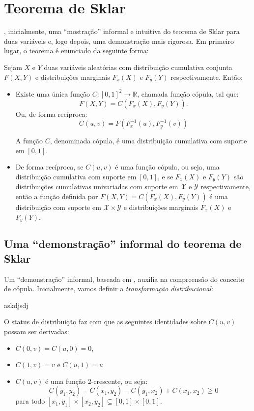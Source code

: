 \chapter{Teorema de Sklar}

, inicialmente, uma ``mostração'' informal e intuitiva do teorema de Sklar para duas variáveis e, logo depois, uma demonstração mais rigorosa. Em primeiro lugar, o teorema é enunciado da seguinte forma:

\begin{Teorema}
Sejam $X$ e $Y$ duas variáveis aleatórias com distribuição cumulativa conjunta $F(X,Y)$ e distribuições marginais $F_x(X)$ e $F_y(Y)$ respectivamente. Então:
\begin{itemize}
 \item Existe uma única função $C : [0,1]^2 \to \mathbb{R}$, chamada função cópula, tal que:
 \begin{equation}
  F(X, Y)  = C(F_x(X), F_y(Y)).
 \end{equation}
 Ou, de forma recíproca:
 \begin{equation}
 C(u,v) = F(F^{-1}_x(u), F^{-1}_y(v))
 \end{equation}
 
 A função $C$, denominada cópula, é uma distribuição cumulativa com suporte em $[0,1]$.
 
 \item De forma recíproca, se $C(u,v)$ é uma função cópula, ou seja, uma distribuição cumulativa com suporte em $[0,1]$, e se $F_x(X)$ e $F_y(Y)$ são distribuições cumulativas univariadas com suporte em $\mathcal{X}$ e $\mathcal{Y}$ respectivamente, então a função definida por $F(X, Y)  = C(F_x(X), F_y(Y))$ é uma distribuição com suporte em $\mathcal{X} \times \mathcal{Y}$ e distribuições marginais $F_x(X)$ e $F_y(Y)$.
\end{itemize}
\end{Teorema}

\section{Uma ``demonstração'' informal do teorema de Sklar}

Um ``demonstração'' informal, baseada em \citet{Ruschendorf2009}\cite{Ruschendorf2009}, auxilia na compreensão do conceito de cópula. Inicialmente, vamos definir a \emph{transformação distribucional}:
\begin{Definicao}

askdjsdj

\end{Definicao}



\newpage
O status de distribuição faz com que as seguintes identidades sobre $C(u,v)$ possam ser derivadas:
 \begin{itemize}
 \item $C(0,v) = C(u,0) = 0$,
 \item $C(1,v) = v$ e $C(u, 1) = u$
 \item $C(u,v)$ é uma função 2-crescente, ou seja: \[C(y_1,y_2)-C(x_1,y_2)-C(y_1,x_2)+C(x_1,x_2) \geq 0\] para todo $[x_1,y_1]\times[x_2,y_2]\subseteq [0,1]\times[0,1]$.
 \end{itemize}
